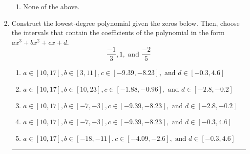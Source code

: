 \documentclass[14pt]{extbook}
\newcommand{\litem}[1]{\item#1\hspace*{-1cm}\rule{\textwidth}{0.4pt}}
\begin{document}
\begin{enumerate}
{\begin{enumerate}[label=\Alph*.]
\item None of the above.
\end{enumerate} }
\litem{
Construct the lowest-degree polynomial given the zeros below. Then, choose the intervals that contain the coefficients of the polynomial in the form $ax^3+bx^2+cx+d$.\[ \frac{-1}{3}, 1, \text{ and } \frac{-2}{5} \]\begin{enumerate}[label=\Alph*.]
\item \( a \in [10, 17], b \in [3, 11], c \in [-9.39, -8.23], \text{ and } d \in [-0.3, 4.6] \)
\item \( a \in [10, 17], b \in [10, 23], c \in [-1.88, -0.96], \text{ and } d \in [-2.8, -0.2] \)
\item \( a \in [10, 17], b \in [-7, -3], c \in [-9.39, -8.23], \text{ and } d \in [-2.8, -0.2] \)
\item \( a \in [10, 17], b \in [-7, -3], c \in [-9.39, -8.23], \text{ and } d \in [-0.3, 4.6] \)
\item \( a \in [10, 17], b \in [-18, -11], c \in [-4.09, -2.6], \text{ and } d \in [-0.3, 4.6] \)


\end{enumerate}}
\end{enumerate}
\end{document}
